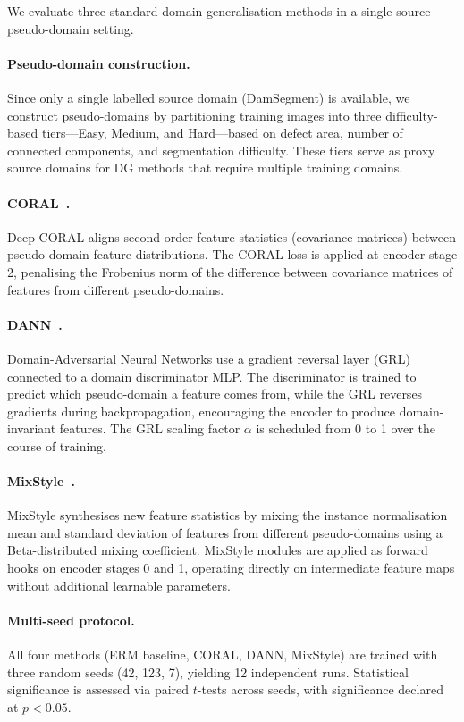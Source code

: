 \documentclass[preprint,12pt]{elsarticle}
\begin{document}
We evaluate three standard domain generalisation methods in a single-source pseudo-domain setting.

\paragraph{Pseudo-domain construction.}
Since only a single labelled source domain (DamSegment) is available, we construct pseudo-domains by partitioning training images into three difficulty-based tiers---Easy, Medium, and Hard---based on defect area, number of connected components, and segmentation difficulty. These tiers serve as proxy source domains for DG methods that require multiple training domains.

\paragraph{CORAL~\cite{sun2016coral}.}
Deep CORAL aligns second-order feature statistics (covariance matrices) between pseudo-domain feature distributions. The CORAL loss is applied at encoder stage 2, penalising the Frobenius norm of the difference between covariance matrices of features from different pseudo-domains.

\paragraph{DANN~\cite{ganin2016dann}.}
Domain-Adversarial Neural Networks use a gradient reversal layer (GRL) connected to a domain discriminator MLP. The discriminator is trained to predict which pseudo-domain a feature comes from, while the GRL reverses gradients during backpropagation, encouraging the encoder to produce domain-invariant features. The GRL scaling factor $\alpha$ is scheduled from 0 to 1 over the course of training.

\paragraph{MixStyle~\cite{zhou2021mixstyle, zhou2023mixstyle}.}
MixStyle synthesises new feature statistics by mixing the instance normalisation mean and standard deviation of features from different pseudo-domains using a Beta-distributed mixing coefficient. MixStyle modules are applied as forward hooks on encoder stages 0 and 1, operating directly on intermediate feature maps without additional learnable parameters.

\paragraph{Multi-seed protocol.}
All four methods (ERM baseline, CORAL, DANN, MixStyle) are trained with three random seeds (42, 123, 7), yielding 12 independent runs. Statistical significance is assessed via paired $t$-tests across seeds, with significance declared at $p < 0.05$.
\end{document}
